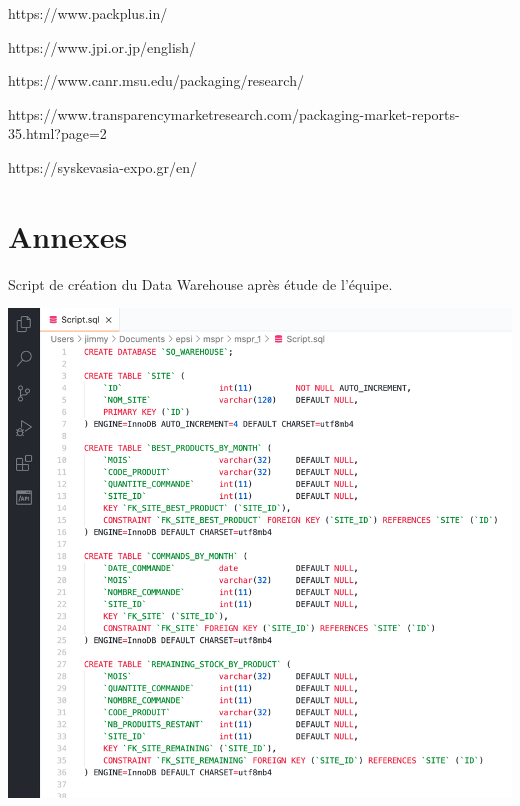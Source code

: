 https://www.packplus.in/ 

https://www.jpi.or.jp/english/ 

https://www.canr.msu.edu/packaging/research/ 

https://www.transparencymarketresearch.com/packaging-market-reports-35.html?page=2 

https://syskevasia-expo.gr/en/ 

\newpage

\section*{Annexes}

Script de création du Data Warehouse après étude de l'équipe.

\begin{center}
	\includegraphics[scale=0.85]{images/script.png} 
\end{center}  




